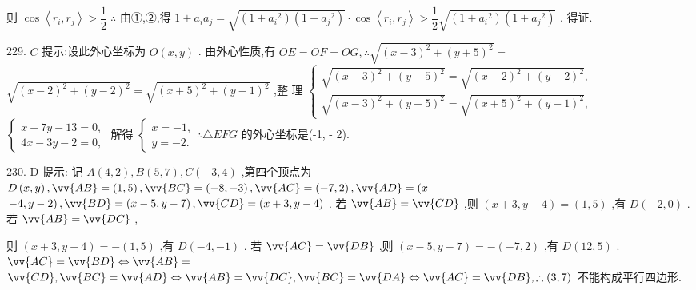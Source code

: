则 $\cos \left\langle  {{r}_{i},{r}_{j}}\right\rangle   > \dfrac{1}{2}\;\therefore$ 由①,②,得 $1 + {a}_{i}{a}_{j} = \sqrt{\left( {1 + {a}_{i}{}^{2}}\right) \left( {1 + {a}_{j}{}^{2}}\right) } \cdot  \cos \left\langle  {{r}_{i},{r}_{j}}\right\rangle   > \dfrac{1}{2}\sqrt{\left( {1 + {a}_{i}{}^{2}}\right) \left( {1 + {a}_{j}{}^{2}}\right) }$ . 得证.

229. $C$ 提示:设此外心坐标为 $O\left( {x,y}\right)$ . 由外心性质,有 ${OE} = {OF} = {OG},\therefore \sqrt{{\left( x - 3\right) }^{2} + {\left( y + 5\right) }^{2}} =$  $\sqrt{{\left( x - 2\right) }^{2} + {\left( y - 2\right) }^{2}} = \sqrt{{\left( x + 5\right) }^{2} + {\left( y - 1\right) }^{2}}$ ,整 理 $\left\{  \begin{array}{l} \sqrt{{\left( x - 3\right) }^{2} + {\left( y + 5\right) }^{2}} = \sqrt{{\left( x - 2\right) }^{2} + {\left( y - 2\right) }^{2}}, \\  \sqrt{{\left( x - 3\right) }^{2} + {\left( y + 5\right) }^{2}} = \sqrt{{\left( x + 5\right) }^{2} + {\left( y - 1\right) }^{2}}, \end{array}\right.$  $\left\{  \begin{array}{l} x - {7y} - {13} = 0, \\  {4x} - {3y} - 2 = 0, \end{array}\right.$ 解得 $\left\{  {\begin{array}{l} x =  - 1, \\  y =  - 2. \end{array}\therefore  \bigtriangleup  {EFG}}\right.$ 的外心坐标是(-1, - 2).

230. D 提示: 记 $A\left( {4,2}\right) ,B\left( {5,7}\right) ,C\left( {-3,4}\right)$ ,第四个顶点为 $D\left( {x,y}\right) ,\vv{AB} = \left( {1,5}\right) ,\vv{BC} = \left( {-8, - 3}\right) ,\vv{AC} = \left( {-7,2}\right) ,\vv{AD} = (x$  $\left. {-4,y - 2}\right) ,\vv{BD} = \left( {x - 5,y - 7}\right) ,\vv{CD} = \left( {x + 3,y - 4}\right)$ . 若 $\vv{AB} = \vv{CD}$ ,则 $\left( {x + 3,y - 4}\right)  = \left( {1,5}\right)$ ,有 $D\left( {-2,0}\right)$ . 若 $\vv{AB} = \vv{DC}$ ,

则 $\left( {x + 3,y - 4}\right)  =  - \left( {1,5}\right)$ ,有 $D\left( {-4, - 1}\right)$ . 若 $\vv{AC} = \vv{DB}$ ,则 $\left( {x - 5,y - 7}\right)  =  - \left( {-7,2}\right)$ ,有 $D\left( {{12},5}\right)$ . $\vv{AC} = \vv{BD} \Leftrightarrow  \vv{AB} =$  $\vv{CD},\vv{BC} = \vv{AD} \Leftrightarrow  \vv{AB} = \vv{DC},\vv{BC} = \vv{DA} \Leftrightarrow  \vv{AC} = \vv{DB},\therefore \left( {3,7}\right)$ 不能构成平行四边形.

